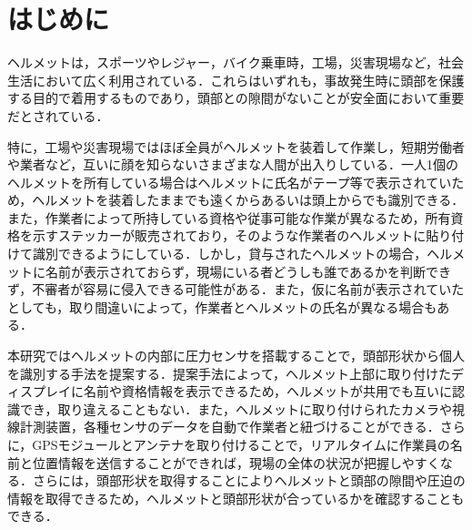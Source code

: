 \documentclass[Japanese,noauthor]{dicomopapers}
\begin{document}
\maketitle

\section{はじめに}
\label{introduction}
ヘルメットは，スポーツやレジャー，バイク乗車時，工場，災害現場など，社会生活において広く利用されている．これらはいずれも，事故発生時に頭部を保護する目的で着用\cite{helmet}するものであり，頭部との隙間がないことが安全面において重要だとされている．\par

特に，工場や災害現場ではほぼ全員がヘルメットを装着して作業し，短期労働者や業者など，互いに顔を知らないさまざまな人間が出入りしている．一人1個のヘルメットを所有している場合はヘルメットに氏名がテープ等で表示されていため，ヘルメットを装着したままでも遠くからあるいは頭上からでも識別できる．また，作業者によって所持している資格や従事可能な作業が異なるため，所有資格を示すステッカーが販売されており，そのような作業者のヘルメットに貼り付けて識別できるようにしている．しかし，貸与されたヘルメットの場合，ヘルメットに名前が表示されておらず，現場にいる者どうしも誰であるかを判断できず，不審者が容易に侵入できる可能性がある．また，仮に名前が表示されていたとしても，取り間違いによって，作業者とヘルメットの氏名が異なる場合もある．
\par


本研究ではヘルメットの内部に圧力センサを搭載することで，頭部形状から個人を識別する手法を提案する．提案手法によって，ヘルメット上部に取り付けたディスプレイに名前や資格情報を表示できるため，ヘルメットが共用でも互いに認識でき，取り違えることもない．また，ヘルメットに取り付けられたカメラや視線計測装置，各種センサのデータを自動で作業者と紐づけることができる．さらに，GPSモジュールとアンテナ\cite{disaster_en}を取り付けることで，リアルタイムに作業員の名前と位置情報を送信することができれば，現場の全体の状況が把握しやすくなる．さらには，頭部形状を取得することによりヘルメットと頭部の隙間や圧迫の情報を取得できるため，ヘルメットと頭部形状が合っているかを確認することもできる．
\end{document}
